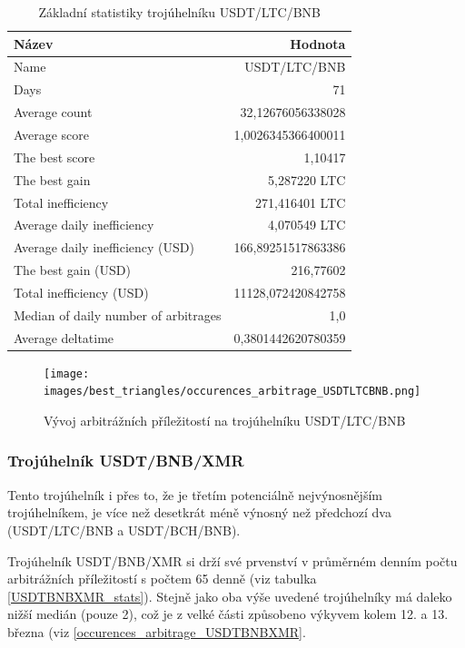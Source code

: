 \documentclass[thesis=B,czech]{FITthesis}[2019/03/21]
\begin{document}
\begin{table}\centering
\caption{Základní statistiky trojúhelníku USDT/LTC/BNB}
\label{USDTLTCBNB_stats}
\begin{tabular}{|| l | r ||}
\hline Název & Hodnota \\ 
\hline\hline Name & USDT/LTC/BNB \\ 
\hline Days & 71 \\ 
\hline Average count & 32,12676056338028 \\ 
\hline Average score & 1,0026345366400011 \\ 
\hline The best score & 1,10417 \\ 
\hline The best gain & 5,287220 LTC \\ 
\hline Total inefficiency & 271,416401 LTC \\ 
\hline Average daily inefficiency & 4,070549 LTC \\ 
\hline Average daily inefficiency (USD) & 166,89251517863386 \\ 
\hline The best gain (USD) & 216,77602 \\ 
\hline Total inefficiency (USD) & 11128,072420842758 \\ 
\hline Median of daily number of arbitrages & 1,0 \\ 
\hline Average deltatime & 0,3801442620780359 \\ 
\hline
\end{tabular}
\end{table}

\begin{figure}\centering
	\texttt{[image: images/best\_triangles/occurences\_arbitrage\_USDTLTCBNB.png]}
	\caption{Vývoj arbitrážních příležitostí na trojúhelníku USDT/LTC/BNB }\label{occurences_arbitrage_USDTLTCBNB}
\end{figure}

\subsubsection{Trojúhelník USDT/BNB/XMR}
Tento trojúhelník i přes to, že je třetím potenciálně nejvýnosnějším trojúhelníkem, je více než desetkrát méně výnosný než předchozí dva (USDT/LTC/BNB a USDT/BCH/BNB).

Trojúhelník USDT/BNB/XMR si drží své prvenství v průměrném denním počtu arbitrážních příležitostí s počtem 65 denně (viz tabulka \ref{USDTBNBXMR_stats}). Stejně jako oba výše uvedené trojúhelníky má daleko nižší medián (pouze 2), což je z velké části způsobeno výkyvem kolem 12. a 13. března (viz \ref{occurences_arbitrage_USDTBNBXMR}.
\end{document}
